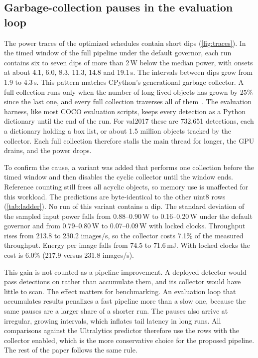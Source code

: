 \subsection{Garbage-collection pauses in the evaluation loop}
\label{sec:gc}

The power traces of the optimized schedules contain short dips
(\cref{fig:traces}). In the timed window of the full pipeline under the
default governor, each run contains six to seven dips of more than
2\,W below the median power, with onsets at about 4.1, 6.0, 8.3, 11.3,
14.8 and 19.1\,s. The intervals between dips grow from 1.9 to 4.3\,s.
This pattern matches CPython's generational garbage collector. A full
collection runs only when the number of long-lived objects has grown by
25\% since the last one, and every full collection traverses all of
them~\cite{python2024gc}. The evaluation harness, like most COCO
evaluation scripts, keeps every detection as a Python dictionary until
the end of the run. For val2017 these are 732,651 detections, each a
dictionary holding a box list, or about 1.5 million objects tracked by
the collector. Each full collection therefore stalls the main thread
for longer, the GPU drains, and the power drops.

To confirm the cause, a variant was added that performs one collection
before the timed window and then disables the cyclic collector until
the window ends. Reference counting still frees all acyclic objects, so
memory use is unaffected for this workload. The predictions are
byte-identical to the other uint8 rows (\cref{tab:ladder}). No run of
this variant contains a dip. The standard deviation of the sampled
input power falls from 0.88--0.90\,W to 0.16--0.20\,W under the default
governor and from 0.79--0.80\,W to 0.07--0.09\,W with locked clocks.
Throughput rises from 213.8 to 230.2 images/s, so the collector costs
7.1\% of the measured throughput. Energy per image falls from 74.5 to
71.6\,mJ. With locked clocks the cost is 6.0\% (217.9 versus
231.8 images/s).

This gain is not counted as a pipeline improvement. A deployed detector
would pass detections on rather than accumulate them, and its collector
would have little to scan. The effect matters for benchmarking. An
evaluation loop that accumulates results penalizes a fast pipeline more
than a slow one, because the same pauses are a larger share of a
shorter run. The pauses also arrive at irregular, growing intervals,
which inflates tail latency in long runs. All comparisons against the
Ultralytics predictor therefore use the rows with the collector
enabled, which is the more conservative choice for the proposed
pipeline. The rest of the paper follows the same rule.
